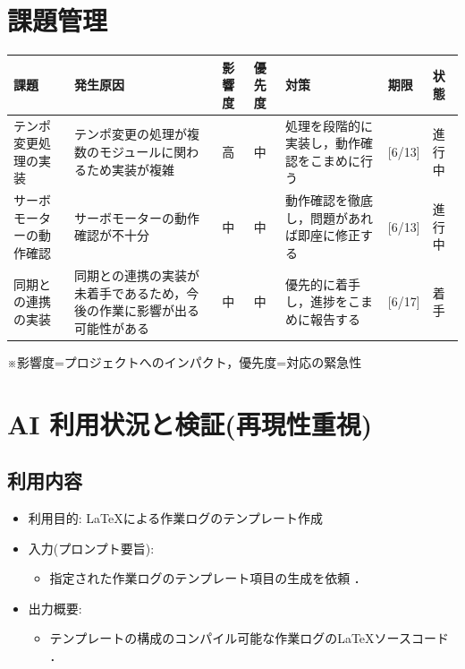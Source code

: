 \documentclass[uplatex,dvipdfmx]{jlreq}
\begin{document}
\section{課題管理}
\begin{table}[H]
    \centering
    \small
    \begin{tabular}{p{3cm}p{3cm}llp{3cm}ll}
        \toprule
        課題 & 発生原因 & 影響度 & 優先度 & 対策 & 期限 & 状態 \\
        \midrule
        テンポ変更処理の実装 & テンポ変更の処理が複数のモジュールに関わるため実装が複雑 & 高 & 中 & 処理を段階的に実装し，動作確認をこまめに行う & [6/13] & 進行中 \\
        サーボモーターの動作確認 & サーボモーターの動作確認が不十分 & 中 & 中 & 動作確認を徹底し，問題があれば即座に修正する & [6/13] & 進行中 \\
        同期との連携の実装 & 同期との連携の実装が未着手であるため，今後の作業に影響が出る可能性がある & 中 & 中 & 優先的に着手し，進捗をこまめに報告する & [6/17] & 着手 \\
        \bottomrule
    \end{tabular}
\end{table}
\vspace{0.5em}
\noindent ※影響度=プロジェクトへのインパクト，優先度=対応の緊急性

\section{AI 利用状況と検証(再現性重視)}
\subsection{利用内容}
\begin{itemize}
    \item 利用目的: \LaTeX による作業ログのテンプレート作成
    \item  入力(プロンプト要旨):
    \begin{itemize}
        \item 指定された作業ログのテンプレート項目の生成を依頼 ．
    \end{itemize}
    \item  出力概要:
    \begin{itemize}
        \item テンプレートの構成のコンパイル可能な作業ログの\LaTeX ソースコード ．
    \end{itemize}
\end{itemize}
\end{document}
